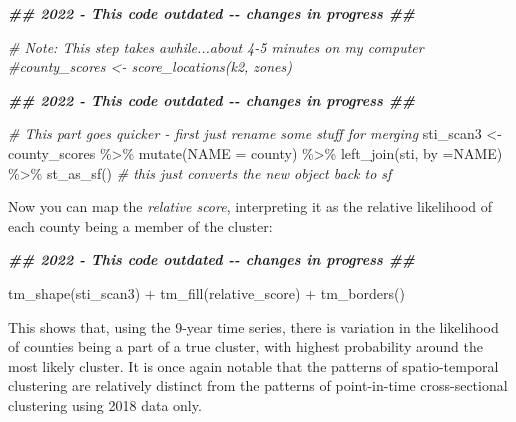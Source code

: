 \documentclass[
]{book}
\newenvironment{Shaded}{\begin{snugshade}}{\end{snugshade}}
\newcommand{\AttributeTok}[1]{\textcolor[rgb]{0.77,0.63,0.00}{#1}}
\newcommand{\CommentTok}[1]{\textcolor[rgb]{0.56,0.35,0.01}{\textit{#1}}}
\newcommand{\DocumentationTok}[1]{\textcolor[rgb]{0.56,0.35,0.01}{\textbf{\textit{#1}}}}
\newcommand{\FunctionTok}[1]{\textcolor[rgb]{0.00,0.00,0.00}{#1}}
\newcommand{\NormalTok}[1]{#1}
\newcommand{\OtherTok}[1]{\textcolor[rgb]{0.56,0.35,0.01}{#1}}
\newcommand{\SpecialCharTok}[1]{\textcolor[rgb]{0.00,0.00,0.00}{#1}}
\newcommand{\StringTok}[1]{\textcolor[rgb]{0.31,0.60,0.02}{#1}}
\begin{document}
\begin{Shaded}
\begin{Highlighting}[]
\DocumentationTok{\#\# 2022 {-} This code outdated {-}{-} changes in progress \#\#}

\CommentTok{\# Note: This step takes awhile...about 4{-}5 minutes on my computer}
\CommentTok{\#county\_scores \textless{}{-} score\_locations(k2, zones)}
\end{Highlighting}
\end{Shaded}

\begin{Shaded}
\begin{Highlighting}[]
\DocumentationTok{\#\# 2022 {-} This code outdated {-}{-} changes in progress \#\#}

\CommentTok{\# This part goes quicker {-} first just rename some stuff for merging}
\NormalTok{sti\_scan3 }\OtherTok{\textless{}{-}}\NormalTok{ county\_scores }\SpecialCharTok{\%\textgreater{}\%} 
  \FunctionTok{mutate}\NormalTok{(}\AttributeTok{NAME =}\NormalTok{ county) }\SpecialCharTok{\%\textgreater{}\%}
  \FunctionTok{left\_join}\NormalTok{(sti, }\AttributeTok{by =}\StringTok{\textquotesingle{}NAME\textquotesingle{}}\NormalTok{) }\SpecialCharTok{\%\textgreater{}\%}
  \FunctionTok{st\_as\_sf}\NormalTok{() }\CommentTok{\# this just converts the new object back to \textquotesingle{}sf\textquotesingle{}}
\end{Highlighting}
\end{Shaded}

Now you can map the \emph{relative score}, interpreting it as the relative likelihood of each county being a member of the cluster:

\begin{Shaded}
\begin{Highlighting}[]
\DocumentationTok{\#\# 2022 {-} This code outdated {-}{-} changes in progress \#\#}

\FunctionTok{tm\_shape}\NormalTok{(sti\_scan3) }\SpecialCharTok{+}
  \FunctionTok{tm\_fill}\NormalTok{(}\StringTok{\textquotesingle{}relative\_score\textquotesingle{}}\NormalTok{) }\SpecialCharTok{+} 
  \FunctionTok{tm\_borders}\NormalTok{()}
\end{Highlighting}
\end{Shaded}

This shows that, using the 9-year time series, there is variation in the likelihood of counties being a part of a true cluster, with highest probability around the most likely cluster. It is once again notable that the patterns of spatio-temporal clustering are relatively distinct from the patterns of point-in-time cross-sectional clustering using 2018 data only.
\end{document}
